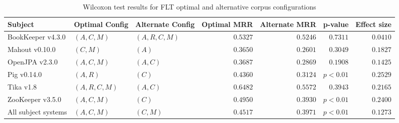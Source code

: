 
\begin{table}
\begin{spacing}{1.2}
\centering
\caption{Wilcoxon test results for FLT optimal and alternative corpus configurations}
\label{table:combo-flt-corpus-sweep-wilcox}
\begin{tabular}{lllrrrr}
\toprule
                      Subject &  Optimal Config & Alternate Config & Optimal MRR & Alternate MRR &  p-value & Effect size \\
\midrule
            BookKeeper v4.3.0 &     $(A, C, M)$ &   $(A, R, C, M)$ &    $0.5327$ &      $0.5246$ & $0.7311$ &    $0.0410$ \\
               Mahout v0.10.0 &        $(C, M)$ &            $(A)$ &    $0.3650$ &      $0.2601$ & $0.3049$ &    $0.1827$ \\
               OpenJPA v2.3.0 &     $(A, C, M)$ &         $(A, C)$ &    $0.3687$ &      $0.2869$ & $0.1908$ &    $0.1425$ \\
                  Pig v0.14.0 &        $(A, R)$ &            $(C)$ &    $0.4360$ &      $0.3124$ & $p<0.01$ &    $0.2529$ \\
                    Tika v1.8 &  $(A, R, C, M)$ &         $(A, C)$ &    $0.6482$ &      $0.5572$ & $0.3943$ &    $0.2165$ \\
             ZooKeeper v3.5.0 &     $(A, C, M)$ &            $(C)$ &    $0.4950$ &      $0.3930$ & $p<0.01$ &    $0.2400$ \\
 \midrule
All subject systems &     $(A, C, M)$ &         $(C, M)$ &    $0.4517$ &      $0.3971$ & $p<0.01$ &    $0.1273$ \\
\bottomrule
\end{tabular}

\end{spacing}
\end{table}

